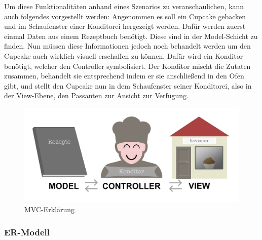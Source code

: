Um diese Funktionalitäten anhand eines Szenarios zu veranschaulichen, kann auch folgendes vorgestellt werden:
Angenommen es soll ein Cupcake gebacken und im Schaufenster einer Konditorei hergezeigt werden. Dafür werden zuerst einmal Daten aus einem Rezeptbuch benötigt. Diese sind in der Model-Schicht zu finden.
Nun müssen diese Informationen jedoch noch behandelt werden um den Cupcake auch wirklich visuell erschaffen zu können. Dafür wird ein Konditor benötigt, welcher den Controller symbolisiert. 
Der Konditor mischt die Zutaten zusammen, behandelt sie entsprechend indem er sie anschließend in den Ofen gibt, und stellt den Cupcake nun in dem Schaufenster seiner Konditorei, also in der View-Ebene, den Passanten zur Ansicht zur Verfügung.
			\begin{figure}[H]
			\begin{centering}
			\includegraphics[width = 1\textwidth]{Bilder/Jok_mvc}
			\par\end{centering}
			\caption{MVC-Erklärung}
			\label{MVC-Erklärung}
			\end{figure}

    \subsubsection{ER-Modell}

